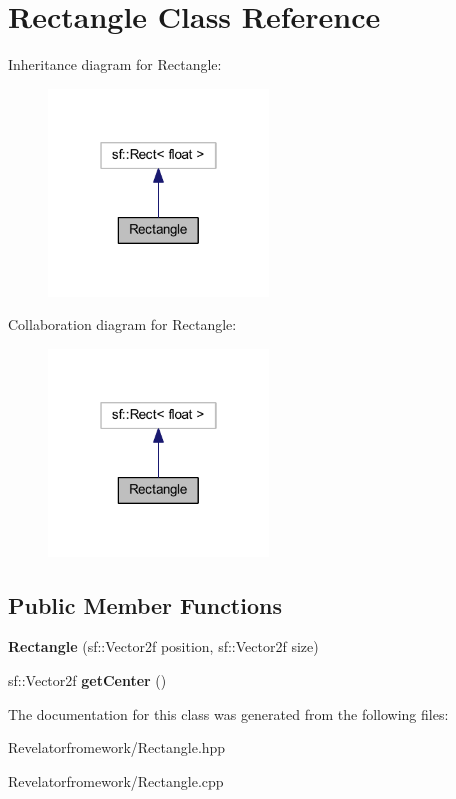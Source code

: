 \hypertarget{class_rectangle}{\section{Rectangle Class Reference}
\label{class_rectangle}
}


Inheritance diagram for Rectangle\-:\nopagebreak
\begin{figure}[H]
\begin{center}
\leavevmode
\includegraphics[width=166pt]{class_rectangle__inherit__graph}
\end{center}
\end{figure}


Collaboration diagram for Rectangle\-:\nopagebreak
\begin{figure}[H]
\begin{center}
\leavevmode
\includegraphics[width=166pt]{class_rectangle__coll__graph}
\end{center}
\end{figure}
\subsection*{Public Member Functions}
\begin{DoxyCompactItemize}
\item 
\hypertarget{class_rectangle_a161582bf7b33ed1235a93de01de067e5}{{\bfseries Rectangle} (sf\-::\-Vector2f position, sf\-::\-Vector2f size)}\label{class_rectangle_a161582bf7b33ed1235a93de01de067e5}

\item 
\hypertarget{class_rectangle_a35c583bfb7eb652de61b7e32895d1579}{sf\-::\-Vector2f {\bfseries get\-Center} ()}\label{class_rectangle_a35c583bfb7eb652de61b7e32895d1579}

\end{DoxyCompactItemize}


The documentation for this class was generated from the following files\-:\begin{DoxyCompactItemize}
\item 
Revelatorfromework/Rectangle.\-hpp\item 
Revelatorfromework/Rectangle.\-cpp\end{DoxyCompactItemize}

